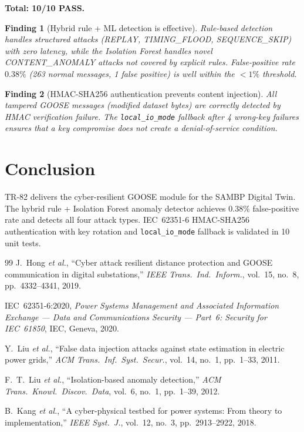 \documentclass[11pt, a4paper]{article}
\newtheorem{finding}{Finding}
\begin{document}
\textbf{Total: 10/10 PASS.}

\begin{finding}[Hybrid rule + ML detection is effective]
Rule-based detection handles structured attacks (REPLAY, TIMING\_FLOOD,
SEQUENCE\_SKIP) with zero latency, while the Isolation Forest handles
novel CONTENT\_ANOMALY attacks not covered by explicit rules.
False-positive rate $0.38\%$ (263 normal messages, 1 false positive)
is well within the $< 1\%$ threshold.
\end{finding}

\begin{finding}[HMAC-SHA256 authentication prevents content injection]
All tampered GOOSE messages (modified dataset bytes) are correctly
detected by HMAC verification failure. The \texttt{local\_io\_mode}
fallback after 4 wrong-key failures ensures that a key compromise
does not create a denial-of-service condition.
\end{finding}

\section{Conclusion}
\label{sec:conclusion}

TR-82 delivers the cyber-resilient GOOSE module for the SAMBP Digital Twin.
The hybrid rule + Isolation Forest anomaly detector achieves $0.38\%$ false-positive
rate and detects all four attack types. IEC~62351-6 HMAC-SHA256 authentication
with key rotation and \texttt{local\_io\_mode} fallback is validated in 10 unit tests.

\begin{thebibliography}{99}
J.~Hong \emph{et al.},
``Cyber attack resilient distance protection and GOOSE communication in
digital substations,''
\emph{IEEE Trans.\ Ind.\ Inform.}, vol.~15, no.~8, pp.~4332--4341, 2019.

IEC~62351-6:2020, \emph{Power Systems Management and Associated Information
Exchange --- Data and Communications Security --- Part~6: Security for
IEC~61850}, IEC, Geneva, 2020.

Y.~Liu \emph{et al.},
``False data injection attacks against state estimation in electric power grids,''
\emph{ACM Trans.\ Inf.\ Syst.\ Secur.}, vol.~14, no.~1, pp.~1--33, 2011.

F.~T.~Liu \emph{et al.},
``Isolation-based anomaly detection,''
\emph{ACM Trans.\ Knowl.\ Discov.\ Data}, vol.~6, no.~1, pp.~1--39, 2012.

B.~Kang \emph{et al.},
``A cyber-physical testbed for power systems: From theory to implementation,''
\emph{IEEE Syst.\ J.}, vol.~12, no.~3, pp.~2913--2922, 2018.
\end{thebibliography}
\end{document}
